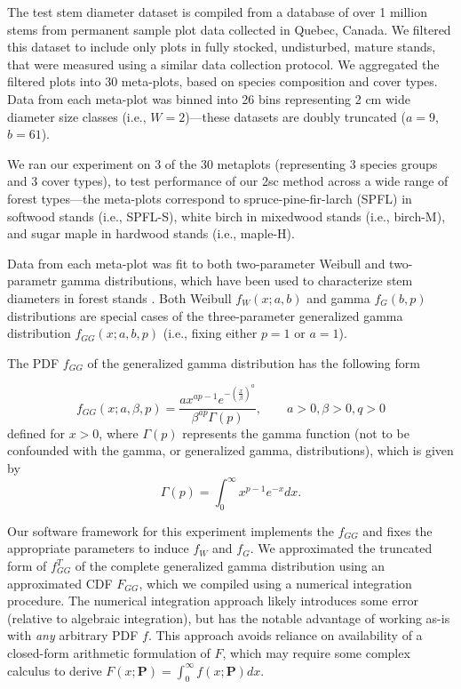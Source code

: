\documentclass{article}
\begin{document}
The test stem diameter dataset is compiled from a database of over 1 million stems from permanent sample plot data collected in Quebec, Canada. We filtered this dataset to include only plots in fully stocked, undisturbed, mature stands, that were measured using a similar data collection protocol. We aggregated the filtered plots into 30 meta-plots, based on species composition and cover types.
Data from each meta-plot was binned into 26 bins representing 2 cm wide diameter size classes (i.e., $W=2$)---these datasets are doubly truncated ($a=9$, $b=61$).

We ran our experiment on 3 of the 30 metaplots (representing 3 species groups and 3 cover types), to test performance of our 2sc method across a wide range of forest types---the meta-plots correspond to spruce-pine-fir-larch (SPFL) in softwood stands (i.e., SPFL-S), white birch in mixedwood stands (i.e., birch-M), and sugar maple in hardwood stands (i.e., maple-H).

Data from each meta-plot was fit to both two-parameter Weibull and two-parametr gamma distributions, which have been used to characterize stem diameters in forest stands \citep{bailey1973quantifying, cao2004predicting, ducey2015sizebiased, zutter1986characterizing, hafley1977statistical}.
Both Weibull $f_W(x;a, b)$ and gamma $f_G(b, p)$ distributions are special cases of the three-parameter generalized gamma distribution $f_{GG}(x; a, b, p)$ (i.e., fixing either $p=1$ or $a=1$).

The PDF $f_{GG}$ of the generalized gamma distribution has the following form

\begin{equation}
f_{GG}(x; a, \beta, p) = \frac{ax^{ap-1}e^{-\left(\frac{x}{\beta}\right)^a}}{\beta^{ap}\Gamma(p)}, \qquad a > 0, \beta > 0, q > 0
\end{equation}
defined for $x > 0$, where $\Gamma(p)$ represents the gamma function (not to be confounded with the gamma, or generalized gamma, distributions), which is given by
\begin{equation}
\Gamma(p) = \int_0^\infty x^{p-1}e^{-x} dx.
\end{equation}

Our software framework for this experiment implements the $f_{GG}$ and fixes the appropriate parameters to induce $f_W$ and $f_G$. 
We approximated the truncated form of $f^T_{GG}$ of the complete generalized gamma distribution using an approximated CDF $F_{GG}$, which we compiled using a numerical integration procedure.
The numerical integration approach likely introduces some error (relative to algebraic integration), but has the notable advantage of working as-is with \emph{any} arbitrary PDF $f$.
This approach avoids reliance on availability of a closed-form arithmetic formulation of $F$, which may require some complex calculus to derive $F(x; \bm{P}) = \int_0^\infty f(x; \bm{P}) dx $.  
\end{document}
